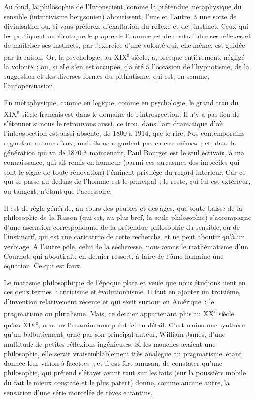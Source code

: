\documentclass[french,twoside]{book} %
\begin{document}
Au fond, la philosophie de l’Inconscient, comme la prétendue métaphysique du sensible (intuitivisme bergsonien) aboutissent, l’une et l’autre, à une sorte de divinisation ou, si vous préférez, d’exaltation du réflexe et de l’instinct. Ceux qui les pratiquent oublient que le propre de l’homme est de contraindre ses réflexes et de maîtriser ses instincts, par l’exercice d’une volonté qui, elle-même, est guidée par la raison. Or, la psychologie, au XIX\textsuperscript{e} siècle, a, presque entièrement, négligé la volonté ; ou, si elle s’en est occupée, ç’a été à l’occasion de l’hypnotisme, de la suggestion et des diverses formes du pithiatisme, qui est, en somme, l’autopersuasion.\par
En métaphysique, comme en logique, comme en psychologie, le grand trou du XIX\textsuperscript{e} siècle français est dans le domaine de l’introspection. Il n’y a pas lieu de s’étonner si nous le retrouvons aussi, ce trou, dans l’art dramatique d’où l’introspection est aussi absente, de 1800 à 1914, que le rire. Nos contemporains regardent autour d’eux, mais ils ne regardent pas en eux-mêmes ; et, dans la génération qui va de 1870 à maintenant, Paul Bourget est le seul écrivain, à ma connaissance, qui ait remis en honneur (parmi ces sarcasmes des imbéciles qui sont le signe de toute rénovation) l’éminent privilège du regard intérieur. Car ce qui se passe au dedans de l’homme est le principal ; le reste, qui lui est extérieur, ou tangent, n’étant que l’accessoire.\par
Il est de règle générale, au cours des peuples et des âges, que toute baisse de la philosophie de la Raison (qui est, au plus bref, la seule philosophie) s’accompagne d’une ascension correspondante de la prétendue philosophie du sensible, ou de l’instinctif, qui est une caricature de cette recherche, et ne peut aboutir qu’à un verbiage. A l’autre pôle, celui de la sécheresse, nous avons le mathématisme d’un Cournot, qui aboutirait, en dernier ressort, à faire de l’âme humaine une équation. Ce qui est faux.\par
Le marasme philosophique de l’époque plate et veule que nous étudions tient en ces deux termes : criticisme et évolutionnisme. Il faut en ajouter un troisième, d’invention relativement récente et qui sévit surtout en Amérique : le pragmatisme ou pluralisme. Mais, ce dernier appartenant plus au XX\textsuperscript{e} siècle qu’au XIX\textsuperscript{e}, nous ne l’examinerons point ici en détail. C’est moins une synthèse qu’un balbutiement, orné par son principal auteur, William James, d’une multitude de petites réflexions ingénieuses. Si les mouches avaient une philosophie, elle serait vraisemblablement très analogue au pragmatisme, étant donnée leur vision à facettes ; et il est fort amusant de constater qu’une philosophie, qui prétend s’étayer avant tout sur les faits (sur la poussière mobile du fait le mieux constaté et le plus patent) donne, comme aucune autre, la sensation d’une série morcelée de rêves enfantins.\par
\end{document}
